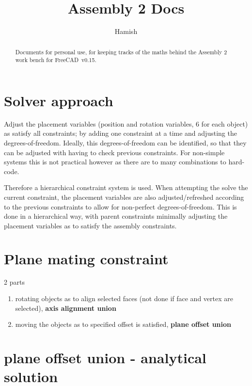 \documentclass[a4paper,10pt]{article}
\title{Assembly 2 Docs }
\author{Hamish}
\begin{document}
\maketitle

\begin{abstract}

Documents for personal use, for keeping tracks of the maths behind the Assembly 2 work bench for FreeCAD~v0.15.

\end{abstract}

\tableofcontents




\section{Solver approach}

Adjust the placement variables (position and rotation variables, 6 for each object) as satisfy all constraints;
by adding one constraint at a time and adjusting the degrees-of-freedom.
Ideally, this degrees-of-freedom can be identified, so that they can be adjusted with having to check previous constraints.
For non-simple systems this is not practical however as there are to many combinations to hard-code.

Therefore a hierarchical constraint system is used.
When attempting the solve the current constraint, the placement variables are also adjusted/refreshed according to the previous constraints to allow for non-perfect degrees-of-freedom.
This is done in a hierarchical way, with parent constraints minimally adjusting the placement variables as to satisfy the assembly constraints.

\section{Plane mating constraint}

2 parts 
\begin{enumerate}
 \item rotating objects as to align selected faces (not done if face and vertex are selected), \textbf{axis alignment union}
 \item moving the objects as to specified offset is satisfied, \textbf{plane offset union}
\end{enumerate}


\section{plane offset union - analytical solution}
\end{document}
